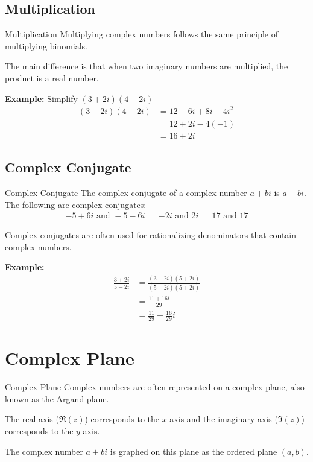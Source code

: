 \documentclass{beamer}
\begin{document}
\subsection{Multiplication}
\begin{frame}{Multiplication}
    Multiplying complex numbers follows the same principle of multiplying binomials. \newline
    
    The main difference is that when two imaginary numbers are multiplied, the product is a real number. \newline

    \textbf{Example:} Simplify $(3 + 2i)(4 - 2i)$
    \begin{align*}
        (3 + 2i)(4 - 2i) &= 12 - 6i + 8i - 4i^2 \\
        &= 12 + 2i -4(-1) \\
        &= 16 + 2i
    \end{align*}
\end{frame}

\subsection{Complex Conjugate}
\begin{frame}{Complex Conjugate}
    The complex conjugate of a complex number $a + bi$ is $a - bi$. The following are complex conjugates:
    \begin{align*}
        -5 + 6i \text{ and } -5 -6i && -2i \text{ and } 2i && 17 \text{ and } 17
    \end{align*}
    
    Complex conjugates are often used for rationalizing denominators that contain complex numbers. \newline
    
    \textbf{Example:}
    \begin{align*}
        \frac{3 + 2i}{5 - 2i} &= \frac{(3 + 2i)(5 + 2i)}{(5 - 2i)(5 + 2i)} \\
        &= \frac{11 + 16i}{29} \\
        &= \frac{11}{29} + \frac{16}{29}i
    \end{align*}
\end{frame}

\section{Complex Plane}
\begin{frame}{Complex Plane}
    Complex numbers are often represented on a complex plane, also known as the Argand plane. \newline
    
    The real axis ($\Re(z)$) corresponds to the $x$-axis and the imaginary axis ($\Im(z)$) corresponds to the $y$-axis. \newline
    
    The complex number $a + bi$ is graphed on this plane as the ordered plane $(a, b)$.

\end{frame}
\end{document}
